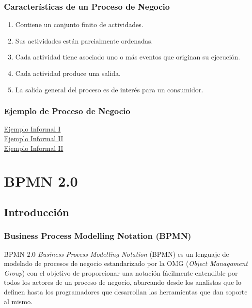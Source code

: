 \documentclass[a4paper,slidestop,xcolor=pst,blue]{beamer}
\begin{document}
\begin{frame}[c]
    \frametitle{Características de un Proceso de Negocio}
    \begin{enumerate}[<+->]
        \item Contiene un conjunto finito de actividades.
        \item Sus actividades están parcialmente ordenadas.
        \item Cada actividad tiene asociado uno o más eventos que originan su ejecución.
        \item Cada actividad produce una salida.
        \item La salida general del proceso es de interés para un consumidor.
    \end{enumerate}
\end{frame}

\begin{frame}[c]
    \frametitle{Ejemplo de Proceso de Negocio}
    \begin{center}
        \href{http://youtu.be/gQ_OHOelPvM}{Ejemplo Informal I} \ \\
        \href{https://youtu.be/bfB38RlXRbI}{Ejemplo Informal II} \ \\
        \href{https://youtu.be/vvbN-cWe0A0}{Ejemplo Informal II} 
    \end{center}
\end{frame}

\section{BPMN 2.0}

\subsection{Introducción}

\begin{frame}[c]
    \frametitle{Business Process Modelling Notation (BPMN)}
    \begin{block}{BPMN 2.0}
        \emph{Business Process Modelling Notation} (BPMN) es un lenguaje de modelado de procesos de negocio estandarizado por la OMG (\emph{Object Managament Group}) con el objetivo de proporcionar una notación fácilmente entendible por todos los actores de un proceso de negocio, abarcando desde los analistas que lo definen hasta los programadores que desarrollan las herramientas que dan soporte al mismo.
    \end{block}
\end{frame}
\end{document}
